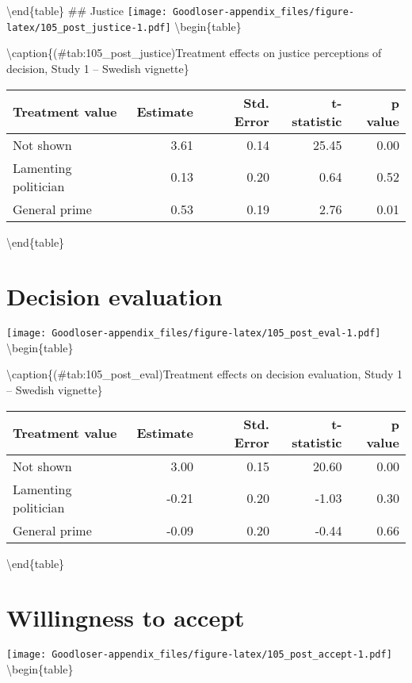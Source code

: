 \documentclass[
]{book}
\begin{document}
\textbackslash end\{table\}
\#\# Justice
\texttt{[image: Goodloser-appendix\_files/figure-latex/105\_post\_justice-1.pdf]} \textbackslash begin\{table\}

\textbackslash caption\{(\#tab:105\_post\_justice)Treatment effects on justice perceptions of decision, Study 1 -- Swedish vignette\}
\centering

\begin{tabular}[t]{lrrrr}
\toprule
Treatment value & Estimate & Std. Error & t-statistic & p value\\
\midrule
Not shown & 3.61 & 0.14 & 25.45 & 0.00\\
Lamenting politician & 0.13 & 0.20 & 0.64 & 0.52\\
General prime & 0.53 & 0.19 & 2.76 & 0.01\\
\bottomrule
\end{tabular}

\textbackslash end\{table\}

\hypertarget{decision-evaluation-1}{%
\section{Decision evaluation}\label{decision-evaluation-1}}

\texttt{[image: Goodloser-appendix\_files/figure-latex/105\_post\_eval-1.pdf]} \textbackslash begin\{table\}

\textbackslash caption\{(\#tab:105\_post\_eval)Treatment effects on decision evaluation, Study 1 -- Swedish vignette\}
\centering

\begin{tabular}[t]{lrrrr}
\toprule
Treatment value & Estimate & Std. Error & t-statistic & p value\\
\midrule
Not shown & 3.00 & 0.15 & 20.60 & 0.00\\
Lamenting politician & -0.21 & 0.20 & -1.03 & 0.30\\
General prime & -0.09 & 0.20 & -0.44 & 0.66\\
\bottomrule
\end{tabular}

\textbackslash end\{table\}

\hypertarget{willingness-to-accept-1}{%
\section{Willingness to accept}\label{willingness-to-accept-1}}

\texttt{[image: Goodloser-appendix\_files/figure-latex/105\_post\_accept-1.pdf]} \textbackslash begin\{table\}
\end{document}
